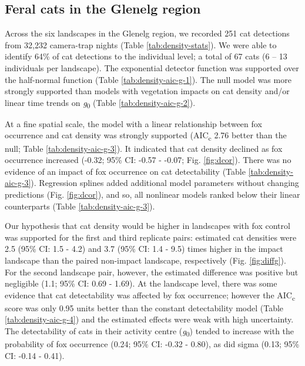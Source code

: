 \documentclass[]{elsarticle} %
\begin{document}
\hypertarget{feral-cats-in-the-glenelg-region}{%
\subsection{Feral cats in the Glenelg region}\label{feral-cats-in-the-glenelg-region}}

Across the six landscapes in the Glenelg region, we recorded 251 cat detections from 32,232 camera-trap nights (Table \ref{tab:density-stats}). We were able to identify 64\% of cat detections to the individual level; a total of 67 cats (6 -- 13 individuals per landscape). The exponential detector function was supported over the half-normal function (Table \ref{tab:density-aic-g-1}). The null model was more strongly supported than models with vegetation impacts on cat density and/or linear time trends on \emph{g}\textsubscript{0} (Table \ref{tab:density-aic-g-2}).

At a fine spatial scale, the model with a linear relationship between fox occurrence and cat density was strongly supported (AIC\textsubscript{c} 2.76 better than the null; Table \ref{tab:density-aic-g-3}). It indicated that cat density declined as fox occurrence increased (-0.32; 95\% CI: -0.57 - -0.07; Fig. \ref{fig:dcor}). There was no evidence of an impact of fox occurrence on cat detectability (Table \ref{tab:density-aic-g-3}). Regression splines added additional model parameters without changing predictions (Fig. \ref{fig:dcor}), and so, all nonlinear models ranked below their linear counterparts (Table \ref{tab:density-aic-g-3}).

Our hypothesis that cat density would be higher in landscapes with fox control was supported for the first and third replicate pairs: estimated cat densities were 2.5 (95\% CI: 1.5 - 4.2) and 3.7 (95\% CI: 1.4 - 9.5) times higher in the impact landscape than the paired non-impact landscape, respectively (Fig. \ref{fig:diffg}). For the second landscape pair, however, the estimated difference was positive but negligible (1.1; 95\% CI: 0.69 - 1.69). At the landscape level, there was some evidence that cat detectability was affected by fox occurrence; however the AIC\textsubscript{c} score was only 0.95 units better than the constant detectability model (Table \ref{tab:density-aic-g-4}) and the estimated effects were weak with high uncertainty. The detectability of cats in their activity centre (\emph{g}\textsubscript{0}) tended to increase with the probability of fox occurrence (0.24; 95\% CI: -0.32 - 0.80), as did sigma (0.13; 95\% CI: -0.14 - 0.41).
\end{document}

